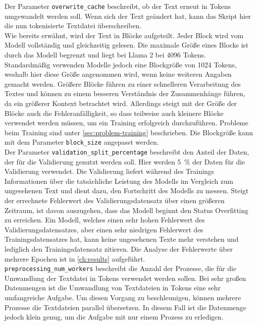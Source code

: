 Der Parameter \texttt{overwrite\_cache} beschreibt, ob der Text erneut in Tokens umgewandelt werden soll.
Wenn sich der Text geändert hat, kann das Skript hier die nun tokenisierte Textdatei überschreiben.\\

Wie bereits erwähnt, wird der Text in Blöcke aufgeteilt.
Jeder Block wird vom Modell vollständig und gleichzeitig gelesen.
Die maximale Größe eines Blocks ist durch das Modell begrenzt und liegt bei Llama 2 bei 4096 Tokens.
Standardmäßig verwenden Modelle jedoch eine Blockgröße von 1024 Tokens, weshalb hier diese Größe angenommen wird, wenn keine weiteren Angaben gemacht werden.
Größere Blöcke führen zu einer schnelleren Verarbeitung des Textes und können zu einem besseren Verständnis der Zusammenhänge führen, da ein größerer Kontext betrachtet wird.
Allerdings steigt mit der Größe der Blöcke auch die Fehleranfälligkeit, so dass teilweise auch kleinere Blöcke verwendet werden müssen, um ein Training erfolgreich durchzuführen.
Probleme beim Training sind unter \cref{sec:problem-training} beschrieben.
Die Blockgröße kann mit dem Parameter \texttt{block\_size} angepasst werden.\\

Der Parameter \texttt{validation\_split\_percentage} beschreibt den Anteil der Daten, der für die Validierung genutzt werden soll.
Hier werden \SI{5}{\percent} der Daten für die Validierung verwendet.
Die Validierung liefert während des Trainings Informationen über die tatsächliche Leistung des Modells im Vergleich zum ungesehenen Text und dient dazu, den Fortschritt des Modells zu messen.
Steigt der errechnete Fehlerwert des Validierungsdatensatz über einen größeren Zeitraum, ist davon auszugehen, dass das Modell beginnt den Status Overfitting zu erreichen.
Ein Modell, welches einen sehr hohen Fehlerwert des Validierungsdatensatzes, aber einen sehr niedrigen Fehlerwert des Trainingsdatensatzes hat, kann keine ungesehenen Texte mehr verstehen und lediglich den Trainingsdatensatz zitieren.
Die Analyse der Fehlerwerte über mehrere Epochen ist in \cref{ch:results} aufgeführt.\\

\texttt{preprocessing\_num\_workers} beschreibt die Anzahl der Prozesse, die für die Umwandlung der Textdatei in Tokens verwendet werden sollen.
Bei sehr großen Datenmengen ist die Umwandlung von Textdateien in Tokens eine sehr umfangreiche Aufgabe.
Um diesen Vorgang zu beschleunigen, können mehrere Prozesse die Textdateien parallel übersetzen.
In diesem Fall ist die Datenmenge jedoch klein genug, um die Aufgabe mit nur einem Prozess zu erledigen.\\

